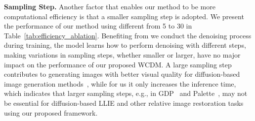 \textbf{Sampling Step.} Another factor that enables our method to be more computational efficiency is that a smaller sampling step  is adopted. We present the performance of our method using different  from 5 to 30 in Table~\ref{tab:efficiency_ablation}. Benefiting from we conduct the denoising process during training, the model learns how to perform denoising with different steps, making variations in sampling steps, whether smaller or larger, have no major impact on the performance of our proposed WCDM. A large sampling step contributes to generating images with better visual quality for diffusion-based image generation methods~\cite{ddpm,ddim}, while for us it only increases the inference time, which indicates that larger sampling steps, e.g.,  in GDP~\cite{GDP} and Palette~\cite{palette}, may not be essential for diffusion-based LLIE and other relative image restoration tasks using our proposed framework.

